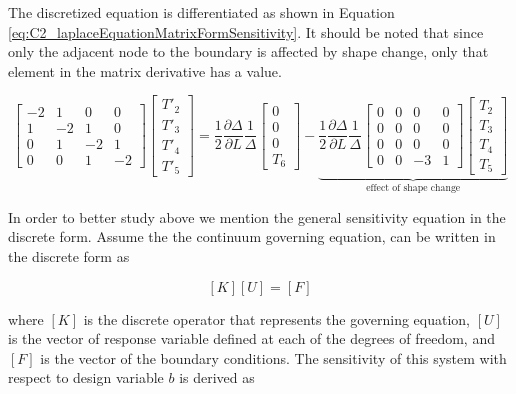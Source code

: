 The discretized equation is differentiated as shown in Equation \eqref{eq:C2_laplaceEquationMatrixFormSensitivity}. It should be noted that since only the adjacent node to the boundary is affected by shape change, only that element in the matrix derivative has a value.

\begin{equation}\label{eq:C2_laplaceEquationMatrixFormSensitivity}
	\begin{bmatrix}
		-2 & 1 & 0 & 0 \\
		1 & -2 & 1 & 0 \\
		0 & 1 & -2 & 1 \\
		0 & 0 & 1 & -2
	\end{bmatrix}
	\begin{bmatrix}
		T'_2 \\
		T'_3 \\
		T'_4 \\
		T'_5
	\end{bmatrix}
	=
	\frac{1}{2} \frac{\partial \Delta}{\partial L} \frac{1}{\Delta}
	\begin{bmatrix}
		0 \\
		0 \\
		0 \\
		T_6
	\end{bmatrix}
	-
	\underbrace{
	\frac{1}{2} \frac{\partial \Delta}{\partial L} \frac{1}{\Delta}
	\begin{bmatrix}
		0 & 0 & 0 & 0 \\
		0 & 0 & 0 & 0 \\
		0 & 0 & 0 & 0 \\
		0 & 0 & -3 & 1
	\end{bmatrix}
	\begin{bmatrix}
		T_2 \\
		T_3 \\
		T_4 \\
		T_5
	\end{bmatrix}}_\text{effect of shape change}
\end{equation}

In order to better study above we mention the general sensitivity equation in the discrete form. Assume the the continuum governing equation, can be written in the discrete form as

\begin{equation*}
	\left[ K \right] \left[ U \right] = \left[ F \right]
\end{equation*}

where $[K]$ is the discrete operator that represents the governing equation, $[U]$ is the vector of response variable defined at each of the degrees of freedom, and $[F]$ is the vector of the boundary conditions. The sensitivity of this system with respect to design variable $b$ is derived as

